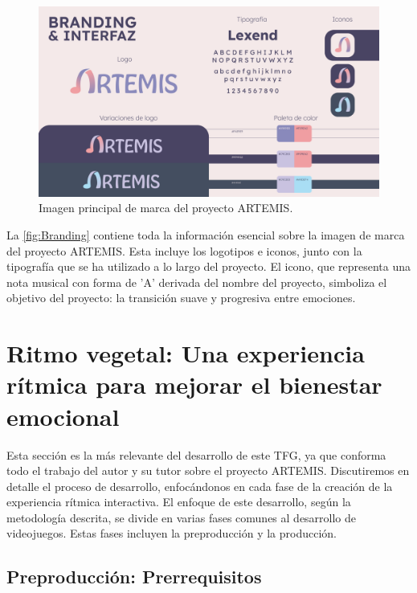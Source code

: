 \begin{figure}[h!]
	\centering
	\includegraphics[width=\linewidth]{Figuras/Desarrollo/Branding.png}
	\caption{Imagen principal de marca del proyecto ARTEMIS.}
	\label{fig:Branding}
\end{figure}

La \autoref{fig:Branding} contiene toda la información esencial sobre la imagen de marca del proyecto ARTEMIS. Esta incluye los logotipos e iconos, junto con la tipografía que se ha utilizado a lo largo del proyecto. El icono, que representa una nota musical con forma de 'A' derivada del nombre del proyecto, simboliza el objetivo del proyecto: la transición suave y progresiva entre emociones.

\section{Ritmo vegetal: Una experiencia rítmica para mejorar el bienestar emocional}

Esta sección es la más relevante del desarrollo de este TFG, ya que conforma todo el trabajo del autor y su tutor sobre el proyecto ARTEMIS. Discutiremos en detalle el proceso de desarrollo, enfocándonos en cada fase de la creación de la experiencia rítmica interactiva. El enfoque de este desarrollo, según la metodología descrita, se divide en varias fases comunes al desarrollo de videojuegos. Estas fases incluyen la preproducción y la producción. 

\subsection{Preproducción: Prerrequisitos}

